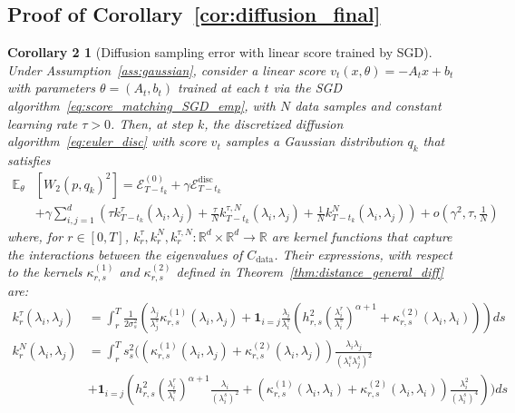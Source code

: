 \documentclass[11pt]{article}
\newcommand{\RR}{\mathbb{R}}
\begin{document}
\subsection{Proof of Corollary~\ref{cor:diffusion_final}} \label{app:diffusion_final}
\newtheorem*{repeatcor2}{Corollary 2}
\begin{repeatcor2}[Diffusion sampling error with linear score trained by SGD]
Under Assumption~\ref{ass:gaussian}, consider a linear score $v_t(x, \theta) = - A_t x + b_t$ with parameters \( \theta=(A_t,b_t)\) trained at each $t$ via the SGD algorithm~\eqref{eq:score_matching_SGD_emp}, with \( N \) data samples and constant learning rate \( \tau > 0 \). Then, at step $k$, the discretized diffusion algorithm~\eqref{eq:euler_disc} with score $v_t$ samples a Gaussian distribution $q_k$ that satisfies \vspace{-0.cm}
\begin{equation*} 
\begin{split}
     \mathbb{E}_{\theta}&\left[W_2\left(p, q_k\right)^2\right] = 
 \mathcal{E}^{(0)}_{T-t_k} + \gamma \mathcal{E}^{\text{disc}}_{T-t_k} \\[-0.2cm] &+ \gamma \sum_{i,j = 1}^d \left(\tau k_{T-t_k}^\tau (\lambda_i, \lambda_j)  + \frac{\tau}{N} k_{T-t_k}^{\tau, N}(\lambda_i, \lambda_j) +\frac{1}{N} k_{T-t_k}^N(\lambda_i, \lambda_j)\right)  + o\left( \gamma^2, \tau, \frac{1}{N} \right)
\end{split} 
 \end{equation*}
where, for $r \in [0,T]$, $k_r^\tau, k_r^N, k_r^{\tau, N} : \RR^d \times \RR^d \to \RR$ are kernel functions that capture the interactions between the eigenvalues of $C_\mathrm{data}$. Their expressions, with respect to the kernels $\kappa^{(1)}_{r,s}$ and $\kappa^{(2)}_{r,s}$ defined in Theorem~\ref{thm:distance_general_diff} are:
\begin{align*}
k_r^\tau (\lambda_i, \lambda_j) &=  \int_r^T\frac{1}{2 \sigma_s^2} \left(\frac{\lambda_j}{\lambda^s_j}\kappa^{(1)}_{r,s}(\lambda_i, \lambda_j) +  \mathbf{1}_{i=j} \frac{\lambda_i}{\lambda^s_i}\left( h_{r,s}^2 \left(\frac{\lambda_i^{r}}{\lambda_i^{s}}\right)^{\alpha+1} + \kappa^{(2)}_{r,s}(\lambda_i, \lambda_i) \right) \right) ds\\
k_r^N (\lambda_i, \lambda_j) &=  \int_r^T s_s^2 \Biggl(\left(\kappa^{(1)}_{r,s}(\lambda_i, \lambda_j)  + \kappa^{(2)}_{r,s}(\lambda_i, \lambda_j) \right) \frac{\lambda_i \lambda_j}{(\lambda^s_i \lambda^s_j)^2}\\
&+ \mathbf{1}_{i=j} \left( h_{r,s}^2   \left(\frac{\lambda_i^{r}}{\lambda_i^{s}}\right)^{\alpha+1} \frac{\lambda_i}{(\lambda^s_i)^2} + \left(\kappa^{(1)}_{r,s}(\lambda_i, \lambda_i)  + \kappa^{(2)}_{r,s}(\lambda_i, \lambda_i) \right) \frac{\lambda_i^2}{(\lambda^s_i)^4}\right) \Biggr) ds \nonumber

\end{align*}
\end{repeatcor2}
\end{document}
